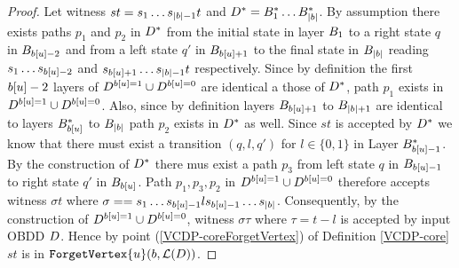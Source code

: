 \begin{proof}
    Let witness $st = s_1\dots s_{|b|-1}t$ and $D^* = B_1^*\dots B_{|b|}^*$. 
    By assumption there exists paths $p_1$ and $p_2$ in $D^*$ from the initial state in layer $B_1$ to a right state $q$ in $B_{b[u]-2}$ and from a left state $q'$ in $B_{b[u]+1}$ to the final state in $B_{|b|}$ reading $s_1\dots s_{b[u]-2}$ and $ s_{b[u]+1}\dots s_{|b|-1}t$ respectively. Since by definition the first $b[u]-2$ layers of $D^{b[u]=1}\cup D^{b[u]=0}$ are identical a those of $D^*$, path $p_1$ exists in $D^{b[u]=1}\cup D^{b[u]=0}$. Also, since by definition layers $B_{b[u]+1}$ to $B_{|b|+1}$ are identical to layers $B_{b[u]}^*$ to $B_{|b|}$ path $p_2$ exists in $D^*$ as well. Since $st$ is accepted by $D^*$ we know that there must exist a transition $(q, l, q')$ for $l\in \{0,1\}$ in Layer $B_{b[u]-1}^*$. By the construction of $D^*$ there mus exist a path $p_3$ from left state $q$ in $B_{b[u]-1}$ to right state $q'$ in $B_{b[u]}$. Path $p_1, p_3, p_2$ in $D^{b[u]=1}\cup D^{b[u]=0}$ therefore accepts witness $\sigma t $ where $\sigma = = s_1\dots s_{b[u]-1}l s_{b[u]-1}\dots s_{|b|}$. Consequently, by the construction of $D^{b[u]=1}\cup D^{b[u]=0}$, witness $\sigma\tau$ where $\tau = t-l$ is accepted by input OBDD $D$. Hence by point (\ref{VCDP-coreForgetVertex}) of Definition \ref{VCDP-core} $st$ is in $\texttt{ForgetVertex}\{u\}(b,\mathcal{L}(D))$.

\end{proof}
